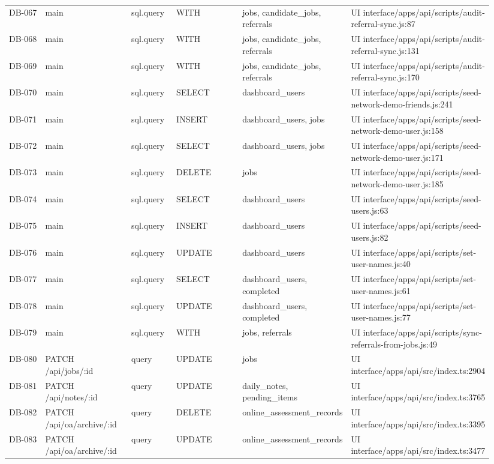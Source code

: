 \documentclass[11pt]{article}
\begin{document}
\begin{longtable}{p{0.10\linewidth}p{0.19\linewidth}p{0.10\linewidth}p{0.18\linewidth}p{0.16\linewidth}p{0.21\linewidth}}
DB-067 & main & sql.query & WITH & jobs, candidate\_jobs, referrals & UI interface/apps/api/scripts/audit-referral-sync.js:87 \\
DB-068 & main & sql.query & WITH & jobs, candidate\_jobs, referrals & UI interface/apps/api/scripts/audit-referral-sync.js:131 \\
DB-069 & main & sql.query & WITH & jobs, candidate\_jobs, referrals & UI interface/apps/api/scripts/audit-referral-sync.js:170 \\
DB-070 & main & sql.query & SELECT & dashboard\_users & UI interface/apps/api/scripts/seed-network-demo-friends.js:241 \\
DB-071 & main & sql.query & INSERT & dashboard\_users, jobs & UI interface/apps/api/scripts/seed-network-demo-user.js:158 \\
DB-072 & main & sql.query & SELECT & dashboard\_users, jobs & UI interface/apps/api/scripts/seed-network-demo-user.js:171 \\
DB-073 & main & sql.query & DELETE & jobs & UI interface/apps/api/scripts/seed-network-demo-user.js:185 \\
DB-074 & main & sql.query & SELECT & dashboard\_users & UI interface/apps/api/scripts/seed-users.js:63 \\
DB-075 & main & sql.query & INSERT & dashboard\_users & UI interface/apps/api/scripts/seed-users.js:82 \\
DB-076 & main & sql.query & UPDATE & dashboard\_users & UI interface/apps/api/scripts/set-user-names.js:40 \\
DB-077 & main & sql.query & SELECT & dashboard\_users, completed & UI interface/apps/api/scripts/set-user-names.js:61 \\
DB-078 & main & sql.query & UPDATE & dashboard\_users, completed & UI interface/apps/api/scripts/set-user-names.js:77 \\
DB-079 & main & sql.query & WITH & jobs, referrals & UI interface/apps/api/scripts/sync-referrals-from-jobs.js:49 \\
DB-080 & PATCH /api/jobs/:id & query & UPDATE & jobs & UI interface/apps/api/src/index.ts:2904 \\
DB-081 & PATCH /api/notes/:id & query & UPDATE & daily\_notes, pending\_items & UI interface/apps/api/src/index.ts:3765 \\
DB-082 & PATCH /api/oa/archive/:id & query & DELETE & online\_assessment\_records & UI interface/apps/api/src/index.ts:3395 \\
DB-083 & PATCH /api/oa/archive/:id & query & UPDATE & online\_assessment\_records & UI interface/apps/api/src/index.ts:3477 \\

\end{longtable}
\end{document}

